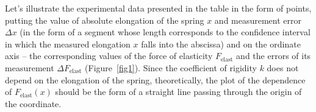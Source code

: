 \documentclass{LabWorkEng}
\begin{document}
\begin{table}[!htbp]\centering
	\tabcaption{}
	\label{tab3}
\pgfplotstabletypeset{\datatable}
\end{table}

Let's illustrate the experimental data presented in the table in the form of points, putting the value of absolute elongation of the spring  $x$ and measurement error $\Delta x$  (in the form of a segment whose length corresponds to the confidence interval in which the measured elongation $x$ falls into the abscissa) and on the ordinate axis -- the corresponding values of the force of elasticity $ F_\mathrm{elast}$ and the errors of its measurement $\Delta F_\mathrm{elast}$ (Figure~\ref{fig1}). Since the coefficient of rigidity $k$ does not depend on the elongation of the spring, theoretically, the plot of the dependence of $F_\mathrm{elast} (x)$ should be the form of a straight line passing through the origin of the coordinate. 
\end{document}

